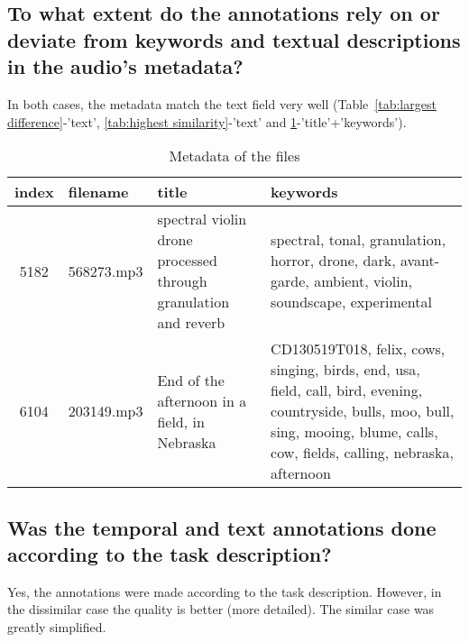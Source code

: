 \subsection{To what extent do the annotations rely on or deviate from keywords and textual descriptions in the audio’s metadata?}
\label{sec:Case Study:b}

In both cases, the metadata match the text field very well (Table~\ref{tab:largest difference}-'text', \ref{tab:highest similarity}-'text' and \ref{tab:metadata match}-'title'+'keywords').

\begin{table}[h]
  \caption{Metadata of the files}
  \label{tab:metadata match}
  \centering
  \begin{tabular}{clp{4cm}p{8.5cm}}
    \toprule
    index & filename & title & keywords \\
    \midrule
    5182 & 568273.mp3 & spectral violin drone processed through granulation and reverb & spectral, tonal, granulation, horror, drone, dark, avant-garde, ambient, violin, soundscape, experimental \\
    6104 & 203149.mp3 & End of the afternoon in a field, in Nebraska & CD130519T018, felix, cows, singing, birds, end, usa, field, call, bird, evening, countryside, bulls, moo, bull, sing, mooing, blume, calls, cow, fields, calling, nebraska, afternoon \\
    \bottomrule
  \end{tabular}
\end{table}

\subsection{Was the temporal and text annotations done according to the task description?}
\label{sec:Case Study:c}

Yes, the annotations were made according to the task description. 
However, in the dissimilar case the quality is better (more detailed). 
The similar case was greatly simplified.


